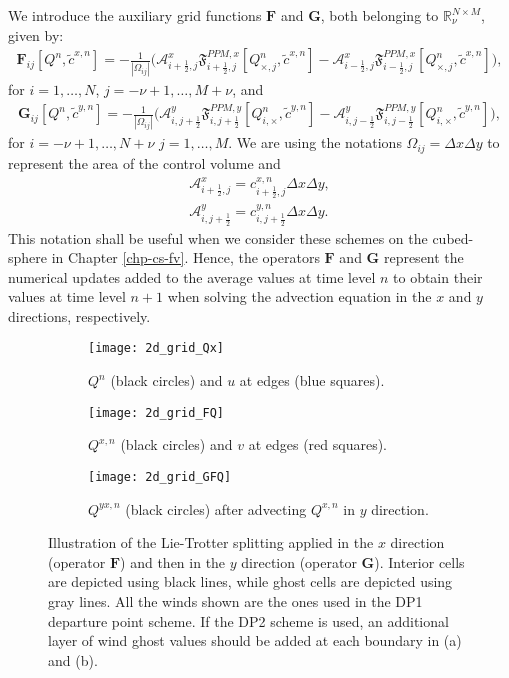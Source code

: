 We introduce the auxiliary grid functions $\mathbf{F}$ and $\mathbf{G}$, both belonging to $\mathbb{R}^{N\times M}_{\nu}$, given by:
\begin{align*}
\mathbf{F}_{ij}[{Q^n,\tilde{c}^{x,n}}] = 
-\frac{1}{|\Omega_{ij}|}
	  \bigg(\mathcal{A}_{i+\frac{1}{2},j}^{x} \mathfrak{F}_{i+\frac{1}{2},j}^{PPM,x}[Q^n_{\times,j},\tilde{c}^{x,n}]-
               \mathcal{A}_{i-\frac{1}{2},j}^{x} \mathfrak{F}_{i-\frac{1}{2},j}^{PPM,x}[Q^n_{\times,j},\tilde{c}^{x,n}] \bigg),
\end{align*}
for $i=1, \ldots, N$, $j=-\nu+1, \ldots, M + \nu$, and
\begin{align*}
\mathbf{G}_{ij}[{Q^n,\tilde{c}^{y,n}}] = 
-\frac{1}{|\Omega_{ij}|}
	  \bigg(\mathcal{A}_{i,j+\frac{1}{2}}^{y} \mathfrak{F}_{i,j+\frac{1}{2}}^{PPM,y}[Q^n_{i,\times},\tilde{c}^{y,n}]-
                \mathcal{A}_{i,j-\frac{1}{2}}^{y} \mathfrak{F}_{i,j-\frac{1}{2}}^{PPM,y}[Q^n_{i,\times},\tilde{c}^{y,n}] \bigg),
\end{align*}
for $i=-\nu+1, \ldots, N + \nu$  $j=1, \ldots, M$.
We are using the notations $\Omega_{ij}= \Delta x \Delta y$ to represent the area of the control volume and
\begin{align*}
\mathcal{A}_{i+\frac{1}{2},j}^{x} = {c}_{i+\frac{1}{2},j}^{x,n} \Delta x \Delta y,\\
\mathcal{A}_{i,j+\frac{1}{2}}^{y} = {c}_{i,j+\frac{1}{2}}^{y,n} \Delta x \Delta y.
\end{align*}
This notation shall be useful when we consider these schemes on the cubed-sphere in Chapter \ref{chp-cs-fv}.
Hence, the operators $\mathbf{F}$ and $\mathbf{G}$ represent the numerical updates added to the average values 
at time level $n$ to obtain their values at time level $n+1$ when solving the advection equation in the $x$ and $y$ directions, respectively.

\begin{figure}[!htb]
	\centering
	\begin{subfigure}{0.3\textwidth}
		\centering
		\texttt{[image: 2d\_grid\_Qx]}
		\caption{$Q^n$ (black circles) and $u$ at edges (blue squares). \label{lt-Qx}}
	\end{subfigure}
	\begin{subfigure}{0.3\textwidth}
		\centering
		\texttt{[image: 2d\_grid\_FQ]}
		\caption{$Q^{x,n}$ (black circles) and $v$ at edges (red squares).\label{lt-FQx} }
	\end{subfigure}
	\begin{subfigure}{0.3\textwidth}
	    \centering
	    \texttt{[image: 2d\_grid\_GFQ]}
		\caption{$Q^{yx,n}$ (black circles) after advecting $Q^{x,n}$ in $y$ direction. \label{lt-GFQx}}
    \end{subfigure}
	\caption{Illustration of the Lie-Trotter splitting applied in the $x$ direction (operator $\mathbf{F}$)
	and then in the $y$ direction (operator $\mathbf{G}$). Interior cells are depicted using black lines,
	 while ghost cells are depicted using gray lines. 
	 All the winds shown are the ones used in the DP1 departure point scheme.
	 If the DP2 scheme is used, an additional layer of wind ghost values should be added at each boundary in (a) and (b). \label{ltxdir}}
\end{figure}


